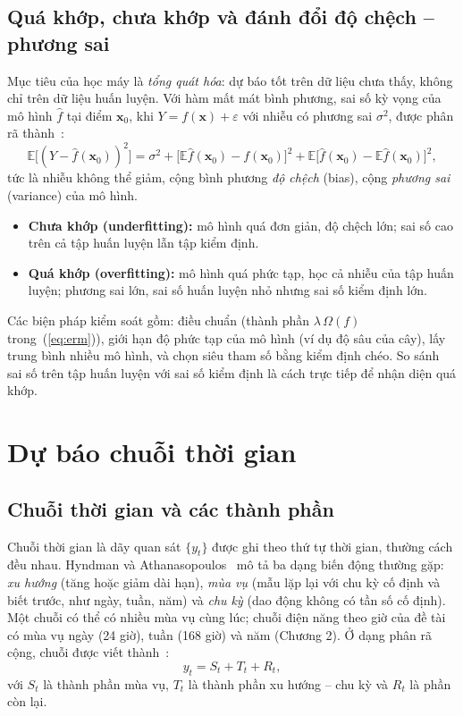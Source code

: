 \documentclass[../main.tex]{subfiles}
\begin{document}
\subsection{Quá khớp, chưa khớp và đánh đổi độ chệch -- phương sai}
Mục tiêu của học máy là \textit{tổng quát hóa}: dự báo tốt trên dữ liệu chưa thấy, không chỉ trên dữ liệu huấn luyện. Với hàm mất mát bình phương, sai số kỳ vọng của mô hình $\hat{f}$ tại điểm $\mathbf{x}_0$, khi $Y = f(\mathbf{x}) + \varepsilon$ với nhiễu có phương sai $\sigma^2$, được phân rã thành~\cite[mục 7.3]{hastie2009elements}:
\begin{equation}
\mathbb{E}\big[(Y - \hat{f}(\mathbf{x}_0))^2\big] = \sigma^2 + \big[\mathbb{E}\hat{f}(\mathbf{x}_0) - f(\mathbf{x}_0)\big]^2 + \mathbb{E}\big[\hat{f}(\mathbf{x}_0) - \mathbb{E}\hat{f}(\mathbf{x}_0)\big]^2,
\end{equation}
tức là nhiễu không thể giảm, cộng bình phương \textit{độ chệch} (bias), cộng \textit{phương sai} (variance) của mô hình.
\begin{itemize}
    \item \textbf{Chưa khớp (underfitting):} mô hình quá đơn giản, độ chệch lớn; sai số cao trên cả tập huấn luyện lẫn tập kiểm định.
    \item \textbf{Quá khớp (overfitting):} mô hình quá phức tạp, học cả nhiễu của tập huấn luyện; phương sai lớn, sai số huấn luyện nhỏ nhưng sai số kiểm định lớn.
\end{itemize}
Các biện pháp kiểm soát gồm: điều chuẩn (thành phần $\lambda\,\Omega(f)$ trong~(\ref{eq:erm})), giới hạn độ phức tạp của mô hình (ví dụ độ sâu của cây), lấy trung bình nhiều mô hình, và chọn siêu tham số bằng kiểm định chéo. So sánh sai số trên tập huấn luyện với sai số kiểm định là cách trực tiếp để nhận diện quá khớp.

\section{Dự báo chuỗi thời gian}

\subsection{Chuỗi thời gian và các thành phần}
Chuỗi thời gian là dãy quan sát $\{y_t\}$ được ghi theo thứ tự thời gian, thường cách đều nhau. Hyndman và Athanasopoulos~\cite[mục 2.3]{hyndman2021fpp3} mô tả ba dạng biến động thường gặp: \textit{xu hướng} (tăng hoặc giảm dài hạn), \textit{mùa vụ} (mẫu lặp lại với chu kỳ cố định và biết trước, như ngày, tuần, năm) và \textit{chu kỳ} (dao động không có tần số cố định). Một chuỗi có thể có nhiều mùa vụ cùng lúc; chuỗi điện năng theo giờ của đề tài có mùa vụ ngày (24 giờ), tuần (168 giờ) và năm (Chương 2). Ở dạng phân rã cộng, chuỗi được viết thành~\cite[mục 3.2]{hyndman2021fpp3}:
\begin{equation}
y_t = S_t + T_t + R_t,
\end{equation}
với $S_t$ là thành phần mùa vụ, $T_t$ là thành phần xu hướng -- chu kỳ và $R_t$ là phần còn lại.
\end{document}
